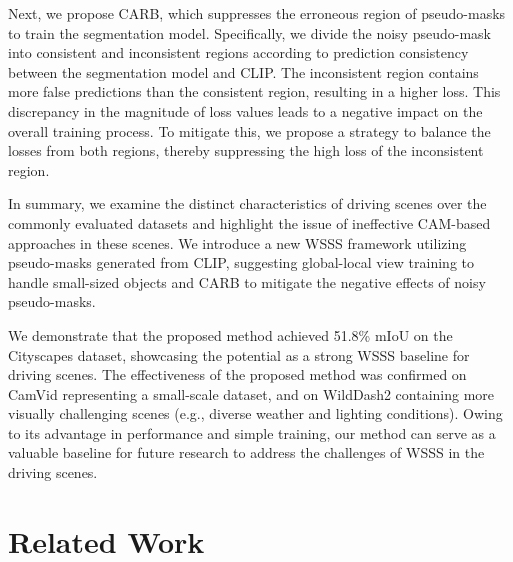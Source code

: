 \documentclass[letterpaper]{article} %
\def\eg{e.g.} \def\Eg{E.g.}
\begin{document}
Next, we propose CARB, which suppresses the erroneous region of pseudo-masks to train the segmentation model. Specifically, we divide the noisy pseudo-mask into consistent and inconsistent regions according to prediction consistency between the segmentation model and CLIP. The inconsistent region contains more false predictions than the consistent region, resulting in a higher loss. This discrepancy in the magnitude of loss values leads to a negative impact on the overall training process. To mitigate this, we propose a strategy to balance the losses from both regions, thereby suppressing the high loss of the inconsistent region.

In summary, we examine the distinct characteristics of driving scenes over the commonly evaluated datasets and highlight the issue of ineffective CAM-based approaches in these scenes. We introduce a new WSSS framework utilizing pseudo-masks generated from CLIP, suggesting global-local view training to handle small-sized objects and CARB to mitigate the negative effects of noisy pseudo-masks. 

We demonstrate that the proposed method achieved 51.8\% mIoU on the Cityscapes dataset, showcasing the potential as a strong WSSS baseline for driving scenes. The effectiveness of the proposed method was confirmed on CamVid representing a small-scale dataset, and on WildDash2 containing more visually challenging scenes (\eg, diverse weather and lighting conditions). Owing to its advantage in performance and simple training, our method can serve as a valuable baseline for future research to address the challenges of WSSS in the driving scenes.

\section{Related Work}
\end{document}
